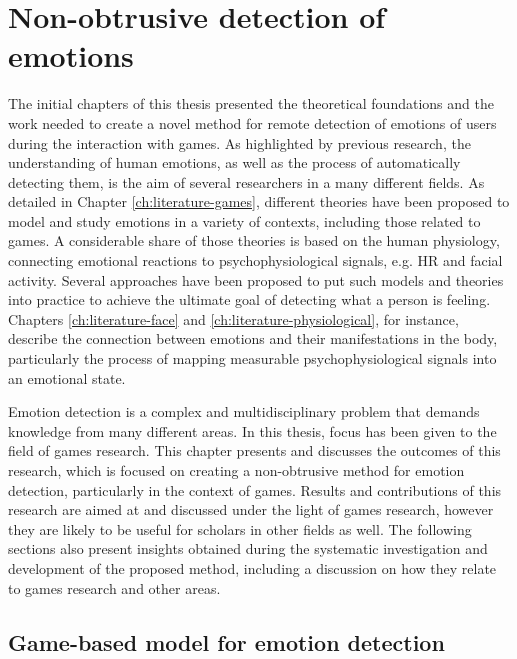 \chapter{Non-obtrusive detection of emotions}
\label{ch:discussion}

The initial chapters of this thesis presented the theoretical foundations and the work needed to create a novel method for remote detection of emotions of users during the interaction with games. As highlighted by previous research, the understanding of human emotions, as well as the process of automatically detecting them, is the aim of several researchers in a many different fields. As detailed in Chapter \ref{ch:literature-games}, different theories have been proposed to model and study emotions in a variety of contexts, including those related to games. A considerable share of those theories is based on the human physiology, connecting emotional reactions to psychophysiological signals, e.g. HR and facial activity. Several approaches have been proposed to put such models and theories into practice to achieve the ultimate goal of detecting what a person is feeling. Chapters \ref{ch:literature-face} and \ref{ch:literature-physiological}, for instance, describe the connection between emotions and their manifestations in the body, particularly the process of mapping measurable psychophysiological signals into an emotional state.

Emotion detection is a complex and multidisciplinary problem that demands knowledge from many different areas. In this thesis, focus has been given to the field of games research. This chapter presents and discusses the outcomes of this research, which is focused on creating a non-obtrusive method for emotion detection, particularly in the context of games. Results and contributions of this research are aimed at and discussed under the light of games research, however they are likely to be useful for scholars in other fields as well. The following sections also present insights obtained during the systematic investigation and development of the proposed method, including a discussion on how they relate to games research and other areas.

\section{Game-based model for emotion detection}


